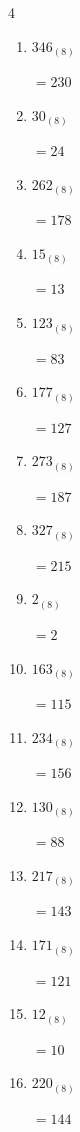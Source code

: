 \begin{multicols}{4}
\begin{enumerate}
  \item $346_{(8)}$

        $=230$

  \item $30_{(8)}$

        $=24$

  \item $262_{(8)}$

        $=178$

  \item $15_{(8)}$

        $=13$

  \item $123_{(8)}$

        $=83$

  \item $177_{(8)}$

        $=127$

  \item $273_{(8)}$

        $=187$

  \item $327_{(8)}$

        $=215$

  \item $2_{(8)}$

        $=2$

  \item $163_{(8)}$

        $=115$

  \item $234_{(8)}$

        $=156$

  \item $130_{(8)}$

        $=88$

  \item $217_{(8)}$

        $=143$

  \item $171_{(8)}$

        $=121$

  \item $12_{(8)}$

        $=10$

\columnbreak %

\resetques

  \item $220_{(8)}$

        $=144$


\end{enumerate}
\end{multicols}
